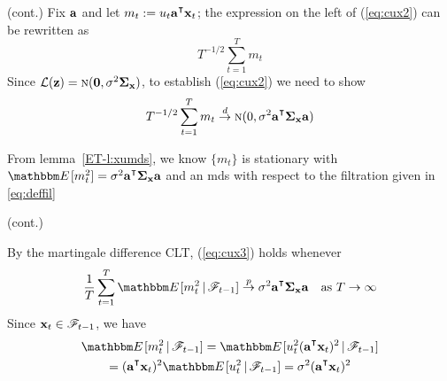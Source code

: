 \begin{frame}

    \vspace{2em}
    \Prf(cont.)
    Fix ${\mathbf a}$ and let $m_t := u_t \bolda^\T \boldx_t$; the expression
    on the left of (\ref{eq:cux2}) can be rewritten as 
        $$T^{-1/2} \sum_{t=1}^T m_t$$
    Since $\mathcal L({\mathbf z}) = \textrm{\sc n}({\mathbf 0}, \sigma^2 {\boldsymbol \Sigma_{{\mathbf x}}})$,
    to establish (\ref{eq:cux2}) we need to show
    \begin{equation}
        \label{eq:cux3}
          T^{-1/2} \sum_{t=1}^T m_t 
          \tod \nN(0, \sigma^2 \bolda^\T \Sigmax \bolda)
    \end{equation}
    
    From lemma~\ref{ET-l:xumds}, we know  $\{m_t\}$ is stationary
    with $\EE[m_t^2] = \sigma^2  \bolda^\T \Sigmax \bolda$ and
    an {\sc mds} with respect to the filtration
    given in \eqref{eq:deffil}
    
   
\end{frame}

\begin{frame}

    \vspace{2em}
    \Prf (cont.)
    
    By the martingale difference CLT, (\ref{eq:cux3}) holds whenever
    \begin{equation}
        \label{eq:laon}
        \frac{1}{T} \sum_{t=1}^T \EE[m_t^2 \given \fF_{t-1} ] 
        \toprob \sigma^2 \bolda^\T \Sigmax \bolda
        \quad \text{as } T \to \infty
    \end{equation}
    Since ${\mathbf x}_t \in \mathscr F_{t-1}$, we have
    \begin{multline*}
        \EE[m_t^2 \given \fF_{t-1} ] 
        = \EE[ u_t^2 (\bolda^\T \boldx_t)^2 \given \fF_{t-1}]
       \\ =  (\bolda^\T \boldx_t)^2 \EE[ u_t^2  \given \fF_{t-1}]
        = \sigma^2 (\bolda^\T \boldx_t)^2 
    \end{multline*}
\end{frame}

